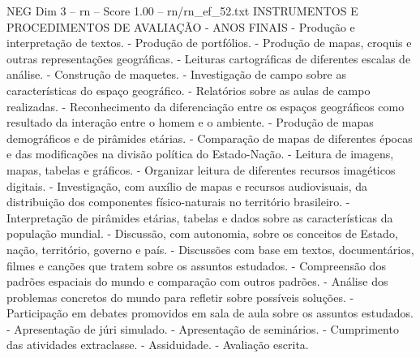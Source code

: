 \begin{textsample}{NEG Dim 3 – rn – Score 1.00 – rn/rn\_ef\_52.txt}  \label{ex:f3_neg_200}
INSTRUMENTOS E PROCEDIMENTOS DE AVALIAÇÃO - ANOS FINAIS - Produção e interpretação de textos. - Produção de portfólios. - Produção de mapas, croquis e outras representações geográficas. - Leituras cartográficas de diferentes escalas de análise. - Construção de maquetes. - Investigação de campo sobre as características do espaço geográfico. - Relatórios sobre as aulas de campo realizadas. - Reconhecimento da diferenciação entre os espaços geográficos como resultado da interação entre o homem e o ambiente. - Produção de mapas demográficos e de pirâmides etárias. - Comparação de mapas de diferentes épocas e das modificações na divisão política do Estado-Nação. - Leitura de imagens, mapas, tabelas e gráficos. - Organizar leitura de diferentes recursos imagéticos digitais. - Investigação, com auxílio de mapas e recursos audiovisuais, da distribuição dos componentes físico-naturais no território brasileiro. - Interpretação de pirâmides etárias, tabelas e dados sobre as características da população mundial. - Discussão, com autonomia, sobre os conceitos de Estado, nação, território, governo e país. - Discussões com base em textos, documentários, filmes e canções que tratem sobre os assuntos estudados. - Compreensão dos padrões espaciais do mundo e comparação com outros padrões. - Análise dos problemas concretos do mundo para refletir sobre possíveis soluções. - Participação em debates promovidos em sala de aula sobre os assuntos estudados. - Apresentação de júri simulado. - Apresentação de seminários. - Cumprimento das atividades extraclasse. - Assiduidade. - Avaliação escrita.

\end{textsample}
